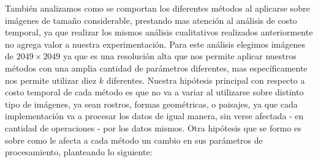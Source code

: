 \documentclass{article}
\begin{document}
También analizamos como se comportan los diferentes métodos al aplicarse sobre imágenes de tamaño considerable, prestando mas atención al análisis de costo temporal, ya que realizar los mismos análisis cualitativos realizados anteriormente no agrega valor a nuestra experimentación.
Para este análisis elegimos imágenes de $2049\times2049$ ya que es una resolución alta que nos permite aplicar nuestros métodos con una amplia cantidad de parámetros diferentes, mas específicamente nos permite utilizar diez $k$ diferentes.
Nuestra hipótesis principal con respecto a costo temporal de cada método es que no va a variar al utilizarse sobre distinto tipo de imágenes, ya sean rostros, formas geométricas, o paisajes, ya que cada implementación va a procesar los datos de igual manera, sin verse afectada - en cantidad de operaciones - por los datos mismos.
Otra hipótesis que se formo es sobre como le afecta a cada método un cambio en sus parámetros de procesamiento, planteando lo siguiente:
\end{document}
